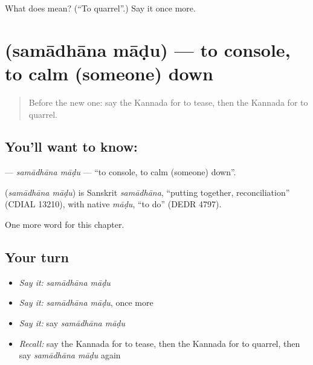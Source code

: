 \begin{tcolorbox}[breakable,colback=teal!4,colframe=teal!35!black,title={Before you move on}]
What does  mean? (\textquotedblleft{}To quarrel\textquotedblright{}.) Say it once more.
\end{tcolorbox}
\section[\texorpdfstring{\kn{ಸಮಾಧಾನ} \kn{ಮಾಡು} (samādhāna māḍu)}{ಸಮಾಧಾನ ಮಾಡು (samādhāna māḍu)}]{  (samādhāna māḍu) — to console, to calm (someone) down}

\label{lesson:KA-C276-samadhana-madu}



\begin{quote}
Before the new one: say the Kannada for to tease, then the Kannada for to quarrel.
\end{quote}

\subsection*{You'll want to know:  }
\textbf{ } — \emph{samādhāna māḍu} — \textquotedblleft{}to console, to calm (someone) down\textquotedblright{}.

\begin{cousinweb}
\textbf{ } (\emph{samādhāna māḍu}) is Sanskrit \emph{samādhāna}, \textquotedblleft{}putting together, reconciliation\textquotedblright{} (CDIAL 13210), with native \emph{māḍu}, \textquotedblleft{}to do\textquotedblright{} (DEDR 4797).
\end{cousinweb}

\begin{grammarlens}[title={What you've built}]
One more word for this chapter.
\end{grammarlens}

\subsection*{Your turn}
\begin{itemize}
\raggedright
  \item \emph{Say it:} \emph{samādhāna māḍu}
  \item \emph{Say it:} \emph{samādhāna māḍu}, once more
  \item \emph{Say it:} say \emph{samādhāna māḍu}
  \item \emph{Recall:} say the Kannada for to tease, then the Kannada for to quarrel, then say \emph{samādhāna māḍu} again
\end{itemize}

